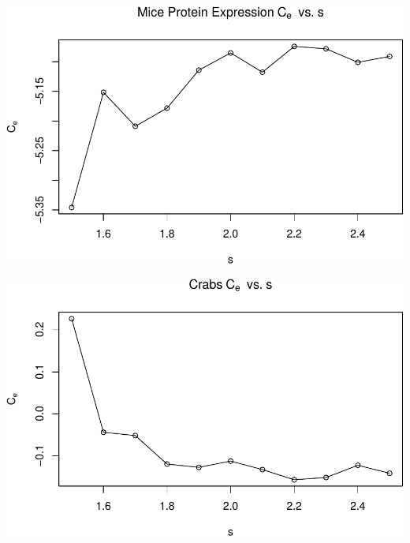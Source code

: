 \begin{center}\includegraphics[width=1\linewidth]{Report_files/figure-latex/unnamed-chunk-26-6} \end{center}

\begin{center}\includegraphics[width=1\linewidth]{Report_files/figure-latex/unnamed-chunk-26-7} \end{center}




